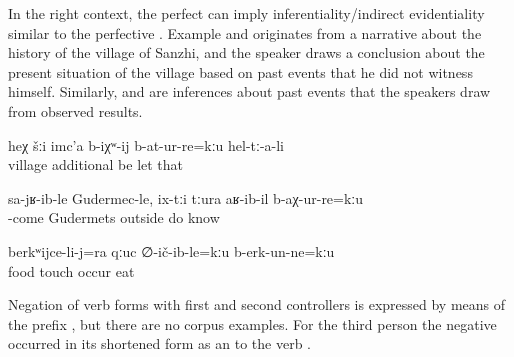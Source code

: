 In the right context, the perfect can imply inferentiality\slash indirect evidentiality similar to the perfective . Example  and originates from a narrative about the history of the village of Sanzhi, and the speaker draws a conclusion about the present situation of the village based on past events that he did not witness himself. Similarly,  and  are inferences about past events that the speakers draw from observed results.



\begin{exe}
	\ex	\label{ex:‎(Apparently,) they have not allowed the village to grow}
	\gll	heχ	šːi	imc'a	b-iχʷ-ij	b-at-ur-re=kːu	hel-tː-a-li\\
			village	additional	be	let	that\\
	\glt	{}

	\ex	\label{ex:‎(Apparently,) when he came to Gudermets he did not know that they had been thrown out (of the village)}
	\gll	sa-jʁ-ib-le	Gudermec-le,		ix-tːi	tːura	aʁ-ib-il	b-aχ-ur-re=kːu\\
		-come	Gudermets		outside	do	know\\
	\glt	{}

	\ex	\label{ex:‎‎(Apparently,) he also has not touched the food, he has not eaten}
	\gll	berkʷijce-li-j=ra	qːuc	∅-ič-ib-le=kːu		b-erk-un-ne=kːu\\
		food	touch	occur	eat\\
	\glt	{}
\end{exe}

Negation of verb forms with first and second  controllers is expressed by means of the prefix , but there are no corpus examples. For the third person the negative   occurred in its shortened form as an  to the verb . 


